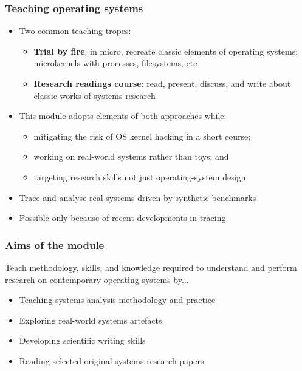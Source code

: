 \begin{frame}
  \frametitle{Teaching operating systems}

  \begin{itemize}
    \item Two common teaching tropes:
    \begin{itemize}
      \item \textbf{Trial by fire}: in micro, recreate classic elements of
	operating systems: microkernels with processes, filesystems, etc
      \item \textbf{Research readings course}: read, present, discuss, and
	write about classic works of systems research
    \end{itemize}

    \pause
    \bigskip

    \item This module adopts elements of both approaches while:
    \begin{itemize}
      \item mitigating the risk of OS kernel hacking in a short course;
      \item working on real-world systems rather than toys; and
      \item targeting research skills not just operating-system design
    \end{itemize}

    \pause
    \bigskip

    \item Trace and analyse real systems driven by synthetic benchmarks
    \item Possible only because of recent developments in tracing

  \end{itemize}
\end{frame}

\begin{frame}
  \frametitle{Aims of the module}

  Teach methodology, skills, and knowledge required to understand and perform
  research on contemporary operating systems by...

  \begin{itemize}
    \item Teaching systems-analysis methodology and practice
    \item Exploring real-world systems artefacts
    \item Developing scientific writing skills
    \item Reading selected original systems research papers
  \end{itemize}
\end{frame}

